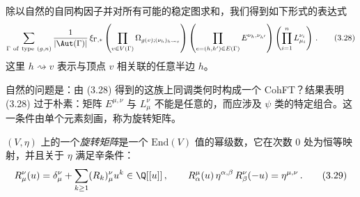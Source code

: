 除以自然的自同构因子并对所有可能的稳定图求和，我们得到如下形式的表达式
\begin{equation}
  \sum_{\Gamma\ \mathrm{of\ type}\ (g,n)}\frac{1}{|\Aut(\Gamma)|}\,\xi_{\Gamma,*}\left(\prod_{v\in V(\Gamma)}\Omega_{g(v);(\nu_{h})_{h\rightsquigarrow v}}\right)\left(\prod_{e=(h,h')\in E(\Gamma)}E^{\nu_{h},\nu_{h'}}\right)\left(\prod_{i=1}^{n}L^{\nu_{i}}_{\mu_{i}}\right)\,.
  \tag{3.28}
\end{equation}
这里 $h\rightsquigarrow v$ 表示与顶点 $v$ 相关联的任意半边 $h$。

自然的问题是：由 (3.28) 得到的这族上同调类何时构成一个 CohFT？结果表明 (3.28) 过于朴素：矩阵 $E^{\mu,\nu}$ 与 $L^{\nu}_{\mu}$ 不能是任意的，而应涉及 $\psi$ 类的特定组合。这一条件由单个元素刻画，称为旋转矩阵。

$(V,\eta)$ 上的一个\emph{旋转矩阵}是一个 $\mathrm{End}(V)$ 值的幂级数，它在次数 $0$ 处为恒等映射，并且关于 $\eta$ 满足辛条件：
\begin{equation}
  R^{\nu}_{\mu}(u)=\delta^{\nu}_{\mu}+\sum_{k\ge1}(R_{k})^{\nu}_{\mu}u^{k}\in\Q[[u]]\,,\qquad
  R^{\mu}_{\alpha}(u)\,\eta^{\alpha,\beta}\,R^{\nu}_{\beta}(-u)=\eta^{\mu,\nu}\,.
  \tag{3.29}
\end{equation}

